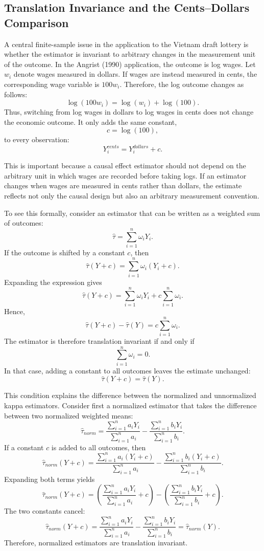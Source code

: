 \documentclass[11pt,a4paper]{article}
\begin{document}
\subsection{Translation Invariance and the Cents--Dollars Comparison}

A central finite-sample issue in the application to the Vietnam draft lottery is
whether the estimator is invariant to arbitrary changes in the measurement unit
of the outcome. In the Angrist (1990) application, the outcome is log wages.
Let \(w_i\) denote wages measured in dollars. If wages are instead measured in
cents, the corresponding wage variable is \(100w_i\). Therefore, the log outcome
changes as follows:
\[
    \log(100w_i)
    =
    \log(w_i) + \log(100).
\]
Thus, switching from log wages in dollars to log wages in cents does not change
the economic outcome. It only adds the same constant,
\[
    c = \log(100),
\]
to every observation:
\[
    Y_i^{cents} = Y_i^{dollars} + c.
\]

This is important because a causal effect estimator should not depend on the
arbitrary unit in which wages are recorded before taking logs. If an estimator
changes when wages are measured in cents rather than dollars, the estimate
reflects not only the causal design but also an arbitrary measurement convention.

To see this formally, consider an estimator that can be written as a weighted
sum of outcomes:
\[
    \hat{\tau}
    =
    \sum_{i=1}^n \omega_i Y_i.
\]
If the outcome is shifted by a constant \(c\), then
\[
    \hat{\tau}(Y+c)
    =
    \sum_{i=1}^n \omega_i (Y_i+c).
\]
Expanding the expression gives
\[
    \hat{\tau}(Y+c)
    =
    \sum_{i=1}^n \omega_i Y_i
    +
    c \sum_{i=1}^n \omega_i.
\]
Hence,
\[
    \hat{\tau}(Y+c)
    -
    \hat{\tau}(Y)
    =
    c \sum_{i=1}^n \omega_i.
\]
The estimator is therefore translation invariant if and only if
\[
    \sum_{i=1}^n \omega_i = 0.
\]
In that case, adding a constant to all outcomes leaves the estimate unchanged:
\[
    \hat{\tau}(Y+c) = \hat{\tau}(Y).
\]

This condition explains the difference between the normalized and unnormalized
kappa estimators. Consider first a normalized estimator that takes the difference
between two normalized weighted means:
\[
    \hat{\tau}_{norm}
    =
    \frac{\sum_{i=1}^n a_i Y_i}{\sum_{i=1}^n a_i}
    -
    \frac{\sum_{i=1}^n b_i Y_i}{\sum_{i=1}^n b_i}.
\]
If a constant \(c\) is added to all outcomes, then
\[
    \hat{\tau}_{norm}(Y+c)
    =
    \frac{\sum_{i=1}^n a_i (Y_i+c)}{\sum_{i=1}^n a_i}
    -
    \frac{\sum_{i=1}^n b_i (Y_i+c)}{\sum_{i=1}^n b_i}.
\]
Expanding both terms yields
\[
    \hat{\tau}_{norm}(Y+c)
    =
    \left(
    \frac{\sum_{i=1}^n a_i Y_i}{\sum_{i=1}^n a_i}
    +
    c
    \right)
    -
    \left(
    \frac{\sum_{i=1}^n b_i Y_i}{\sum_{i=1}^n b_i}
    +
    c
    \right).
\]
The two constants cancel:
\[
    \hat{\tau}_{norm}(Y+c)
    =
    \frac{\sum_{i=1}^n a_i Y_i}{\sum_{i=1}^n a_i}
    -
    \frac{\sum_{i=1}^n b_i Y_i}{\sum_{i=1}^n b_i}
    =
    \hat{\tau}_{norm}(Y).
\]
Therefore, normalized estimators are translation invariant.
\end{document}
